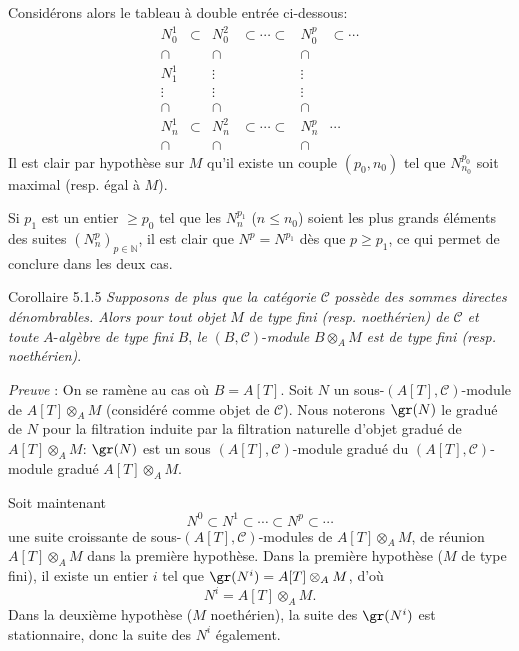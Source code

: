 Considérons alors le tableau à double entrée ci-dessous:
\[
\begin{array}{cccccc}
N_0^1&\subset&N_0^2&\subset\cdots\subset&N_0^p&\subset\cdots\\
\cap&&\cap&&\cap\\
N_1^1&&\vdots&&\vdots\\
\vdots&&\vdots&&\vdots\\
\cap&&\cap&&\cap\\
N_n^1&\subset&N_n^2&\subset\cdots\subset&N_n^p&\cdots\\
\cap&&\cap&&\cap
\end{array}
\]
Il est clair par hypothèse sur \(M\) qu'il existe un couple \((p_0,n_0)\) tel que \(N^{p_0}_{n_0}\) soit maximal (resp. égal à \(M\)).

Si \(p_1\) est un entier \(\ge p_0\) tel que les \(N_n^{p_1}\) (\(n\le n_0\)) soient les plus grands éléments des suites \((N_n^p)_{p\in\mathbb{N}}\), il est clair que \(N^p=N^{p_1}\) dès que \(p\ge p_1\), ce qui permet de conclure dans les deux cas.

\begin{statement}{Corollaire 5.1.5}
\emph{Supposons de plus que la catégorie} \(\mathcal{C}\) \emph{possède des sommes directes dénombrables. Alors pour tout objet} \(M\) \emph{de type fini (resp. noethérien) de} \(\mathcal{C}\) \emph{et toute} \(A\)-\emph{algèbre de type fini} \(B\), \emph{le} \((B,\mathcal{C})\)-\emph{module} \(B\otimes_A M\) \emph{est de type fini (resp. noethérien)}.
\end{statement}

\emph{Preuve} : On se ramène au cas où \(B=A[T]\). Soit \(N\) un sous-\((A[T],\mathcal{C})\)-module de \(A[T]\otimes_A M\) (considéré comme objet de \(\mathcal{C}\)). Nous noterons \(\gr(N)\) le gradué de \(N\) pour la filtration induite par la filtration naturelle d'objet gradué de \(A[T]\otimes_A M\): \(\gr(N)\) est un sous \((A[T],\mathcal{C})\)-module gradué du \((A[T],\mathcal{C})\)-module gradué \(A[T]\otimes_A M\).

Soit
maintenant
\[
N^0\subset N^1\subset\cdots\subset N^p\subset\cdots
\]
une suite croissante de sous-\((A[T],\mathcal{C})\)-modules de \(A[T]\otimes_A M\), de réunion \(A[T]\otimes_A M\) dans la première hypothèse. Dans la première hypothèse (\(M\) de type fini), il existe un entier \(i\) tel que \(\gr(N^i)=A[T]\otimes_A M\), d'où
\[
N^i=A[T]\otimes_A M.
\]
Dans la deuxième hypothèse (\(M\) noethérien), la suite des \(\gr(N^i)\) est stationnaire, donc la suite des \(N^i\) également.

